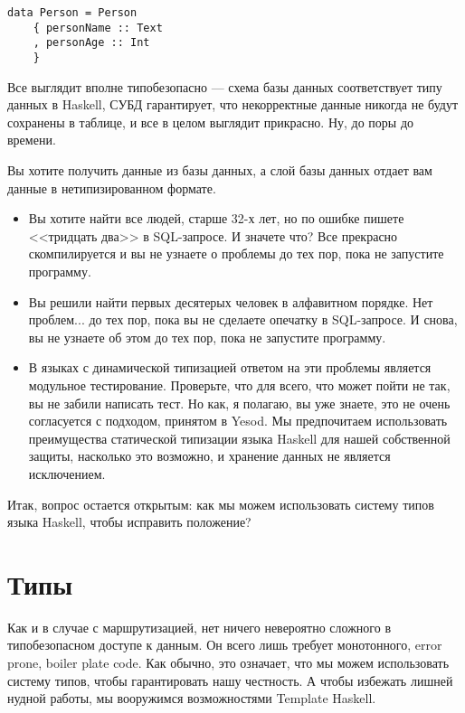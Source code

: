 \begin{lstlisting}
data Person = Person
    { personName :: Text
    , personAge :: Int
    }
\end{lstlisting}

Все выглядит вполне типобезопасно --- схема базы данных соответствует типу данных в Haskell, СУБД гарантирует, что некорректные данные никогда не будут сохранены в таблице, и все в целом выглядит прикрасно. Ну, до поры до времени.

Вы хотите получить данные из базы данных, а слой базы данных отдает вам данные в нетипизированном формате.

\begin{itemize}
  \item Вы хотите найти все людей, старше 32-х лет, но по ошибке пишете <<тридцать два>> в SQL-запросе. И значете что? Все прекрасно скомпилируется и вы не узнаете о проблемы до тех пор, пока не запустите программу.
  \item Вы решили найти первых десятерых человек в алфавитном порядке. Нет проблем... до тех пор, пока вы не сделаете опечатку в SQL-запросе. И снова, вы не узнаете об этом до тех пор, пока не запустите программу.
  \item В языках с динамической типизацией ответом на эти проблемы является модульное тестирование. Проверьте, что для всего, что может пойти не так, вы не забили написать тест. Но как, я полагаю, вы уже знаете, это не очень согласуется с подходом, принятом в Yesod. Мы предпочитаем использовать преимущества статической типизации языка Haskell для нашей собственной защиты, насколько это возможно, и хранение данных не является исключением.
\end{itemize}

Итак, вопрос остается открытым: как мы можем использовать систему типов языка Haskell, чтобы исправить положение?

\section{Типы} %

Как и в случае с маршрутизацией, нет ничего невероятно сложного в типобезопасном доступе к данным. Он всего лишь требует монотонного, error prone, boiler plate code. Как обычно, это означает, что мы можем использовать систему типов, чтобы гарантировать нашу честность. А чтобы избежать лишней нудной работы, мы вооружимся возможностями Template Haskell. %


